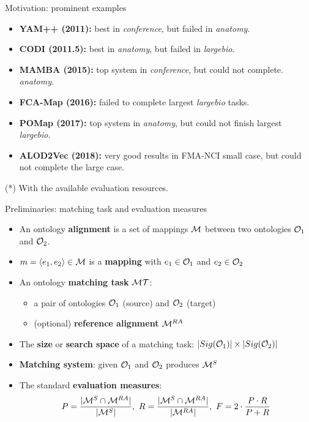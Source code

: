 \documentclass[t]{beamer}
\begin{document}
\begin{frame}{Motivation: prominent examples}

  		\begin{itemize}    
  			\item \textbf{YAM++ (2011):} best in \emph{conference}, but failed in
  			\emph{anatomy}.
            \item \textbf{CODI (2011.5):} best in \emph{anatomy}, but failed in
            \emph{largebio}.
            \item \textbf{MAMBA (2015):} top system in \emph{conference},
            but could not complete. \emph{anatomy}.
            \item<2-> \textbf{FCA-Map (2016):} failed to complete largest
            \emph{largebio} tasks.
            \item<2-> \textbf{POMap (2017):} top system in \emph{anatomy}, but
            could not finish largest \emph{largebio}.
            \item<2-> \textbf{ALOD2Vec (2018):} very good results in FMA-NCI
            small case, but could not complete the large case\textbf{}.
		\end{itemize}
  	
  	(*) With the available evaluation resources.
  	
\end{frame}



\begin{frame}{Preliminaries: matching task and evaluation measures}
	
  		\begin{itemize}    
  			\item An ontology \textbf{alignment} is a
set of mappings $\mathcal{M}$ between two ontologies $\mathcal{O}_1$ and $\mathcal{O}_2$.
			\item $m=\langle e_1, e_2 \rangle \in \mathcal{M}$ is a \textbf{mapping} with $e_1\in
			\mathcal{O}_1$ and $e_2\in \mathcal{O}_2$
  			\item<2-> An ontology \textbf{matching task} $\mathcal{M}\mathcal{T}$:
  				\begin{itemize} 
  				  \item a pair of ontologies $\mathcal{O}_1$ (source) and $\mathcal{O}_2$ (target) 
  				  \item (optional) \textbf{reference alignment} $\mathcal{M}^{RA}$
  				 \end{itemize}
  			\item<2-> The \textbf{size} or \textbf{search space} of a matching task:
  			$\lvert Sig(\mathcal{O}_1) \rvert \times \lvert Sig(\mathcal{O}_2) \rvert$
  			
  			\item<3-> \textbf{Matching system}: given $\mathcal{O}_1$ and $\mathcal{O}_2$ produces $\mathcal{M}^{S}$
  			\item<3-> The standard \textbf{evaluation measures}:
  			\begin{equation*}
    P = \frac{\lvert\mathcal{M}^{S} \cap \mathcal{M}^{RA}\rvert}{\lvert\mathcal{M}^{S}\rvert},~
    R = \frac{\lvert\mathcal{M}^{S} \cap \mathcal{M}^{RA}\rvert}{\lvert\mathcal{M}^{RA}\rvert},~
    F = 2 \cdot \frac{P \cdot R}{P + R} 
\end{equation*}
		\end{itemize}
  	
\end{frame}
\end{document}
